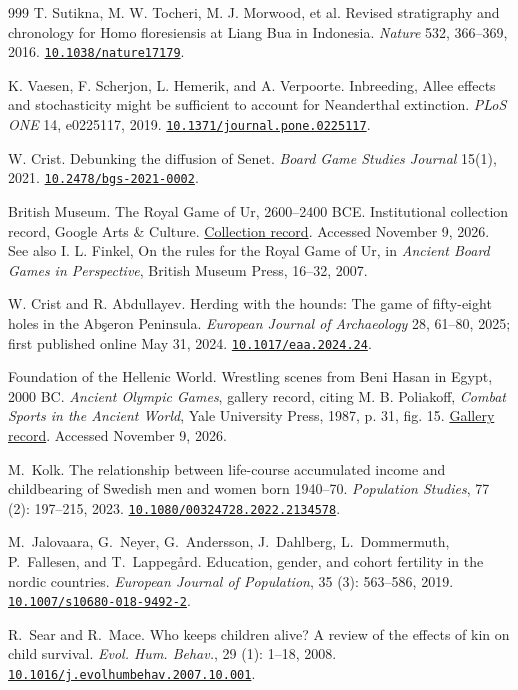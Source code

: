 \documentclass[10pt,twocolumn,letterpaper]{article}
\newcommand{\doi}[1]{\href{https://doi.org/#1}{\nolinkurl{#1}}}
\begin{document}
\begin{thebibliography}{999}
 T. Sutikna, M. W. Tocheri, M. J. Morwood, et al. Revised stratigraphy and chronology for Homo floresiensis at Liang Bua in Indonesia. \emph{Nature} 532, 366--369, 2016. \doi{10.1038/nature17179}.

 K. Vaesen, F. Scherjon, L. Hemerik, and A. Verpoorte. Inbreeding, Allee effects and stochasticity might be sufficient to account for Neanderthal extinction. \emph{PLoS ONE} 14, e0225117, 2019. \doi{10.1371/journal.pone.0225117}.

 W. Crist. Debunking the diffusion of Senet. \emph{Board Game Studies Journal} 15(1), 2021. \doi{10.2478/bgs-2021-0002}.

 British Museum. The Royal Game of Ur, 2600--2400 BCE. Institutional collection record, Google Arts \& Culture. \href{https://artsandculture.google.com/asset/the-royal-game-of-ur/MwE2MMZNSKiTwQ}{Collection record}. Accessed November 9, 2026. See also I. L. Finkel, On the rules for the Royal Game of Ur, in \emph{Ancient Board Games in Perspective}, British Museum Press, 16--32, 2007.

 W. Crist and R. Abdullayev. Herding with the hounds: The game of fifty-eight holes in the Ab\c{s}eron Peninsula. \emph{European Journal of Archaeology} 28, 61--80, 2025; first published online May 31, 2024. \doi{10.1017/eaa.2024.24}.

 Foundation of the Hellenic World. Wrestling scenes from Beni Hasan in Egypt, 2000 BC. \emph{Ancient Olympic Games}, gallery record, citing M. B. Poliakoff, \emph{Combat Sports in the Ancient World}, Yale University Press, 1987, p. 31, fig. 15. \href{https://www.fhw.gr/olympics/ancient/en/gallery/101p1.html}{Gallery record}. Accessed November 9, 2026.

 M.~{Kolk}. {The relationship between life-course accumulated income and childbearing of Swedish men and women born 1940--70}. \emph{Population Studies}, 77 (2): 197--215, 2023. \doi{10.1080/00324728.2022.2134578}.

 M.~{Jalovaara}, G.~{Neyer}, G.~{Andersson}, J.~{Dahlberg}, L.~{Dommermuth}, P.~{Fallesen}, and T.~{Lappegård}. {Education, gender, and cohort fertility in the nordic countries}. \emph{European Journal of Population}, 35 (3): 563--586, 2019. \doi{10.1007/s10680-018-9492-2}.

 R.~{Sear} and R.~{Mace}. {Who keeps children alive? A review of the effects of kin on child survival}. \emph{Evol. Hum. Behav.}, 29 (1): 1--18, 2008. \doi{10.1016/j.evolhumbehav.2007.10.001}.


\end{thebibliography}
\end{document}
